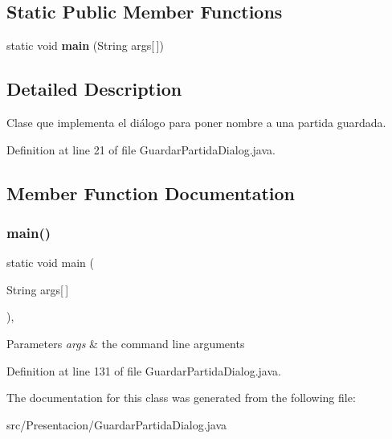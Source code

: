 \subsection*{Static Public Member Functions}
\begin{DoxyCompactItemize}
\item 
static void \textbf{ main} (String args[$\,$])
\end{DoxyCompactItemize}


\subsection{Detailed Description}
Clase que implementa el diálogo para poner nombre a una partida guardada. 

Definition at line 21 of file Guardar\+Partida\+Dialog.\+java.



\subsection{Member Function Documentation}
\mbox{\label{class_presentacion_1_1_guardar_partida_dialog_a75988cf84fc6ee7a2ebff36e363021aa}} 
\subsubsection{main()}
{\footnotesize\ttfamily static void main (\begin{DoxyParamCaption}\item[{String}]{args[$\,$] }\end{DoxyParamCaption})\hspace{0.3cm}{\ttfamily [inline]}, {\ttfamily [static]}}


\begin{DoxyParams}{Parameters}
{\em args} & the command line arguments \\
\hline
\end{DoxyParams}


Definition at line 131 of file Guardar\+Partida\+Dialog.\+java.



The documentation for this class was generated from the following file\+:\begin{DoxyCompactItemize}
\item 
src/\+Presentacion/Guardar\+Partida\+Dialog.\+java\end{DoxyCompactItemize}
